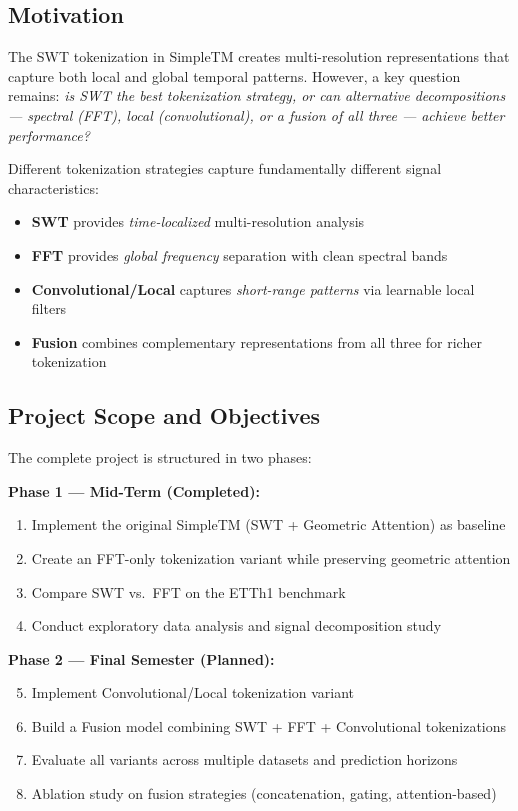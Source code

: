 \documentclass[12pt,a4paper]{article}
\begin{document}
\subsection{Motivation}

The SWT tokenization in SimpleTM creates multi-resolution representations that capture both local and global temporal patterns. However, a key question remains: \textit{is SWT the best tokenization strategy, or can alternative decompositions --- spectral (FFT), local (convolutional), or a fusion of all three --- achieve better performance?}

Different tokenization strategies capture fundamentally different signal characteristics:
\begin{itemize}[noitemsep]
  \item \textbf{SWT} provides \textit{time-localized} multi-resolution analysis
  \item \textbf{FFT} provides \textit{global frequency} separation with clean spectral bands
  \item \textbf{Convolutional/Local} captures \textit{short-range patterns} via learnable local filters
  \item \textbf{Fusion} combines complementary representations from all three for richer tokenization
\end{itemize}

\subsection{Project Scope and Objectives}

The complete project is structured in two phases:

\textbf{Phase 1 --- Mid-Term (Completed):}
\begin{enumerate}[noitemsep]
  \item Implement the original SimpleTM (SWT + Geometric Attention) as baseline
  \item Create an FFT-only tokenization variant while preserving geometric attention
  \item Compare SWT vs.\ FFT on the ETTh1 benchmark
  \item Conduct exploratory data analysis and signal decomposition study
\end{enumerate}

\textbf{Phase 2 --- Final Semester (Planned):}
\begin{enumerate}[noitemsep]
  \setcounter{enumi}{4}
  \item Implement Convolutional/Local tokenization variant
  \item Build a Fusion model combining SWT + FFT + Convolutional tokenizations
  \item Evaluate all variants across multiple datasets and prediction horizons
  \item Ablation study on fusion strategies (concatenation, gating, attention-based)
\end{enumerate}
\end{document}
